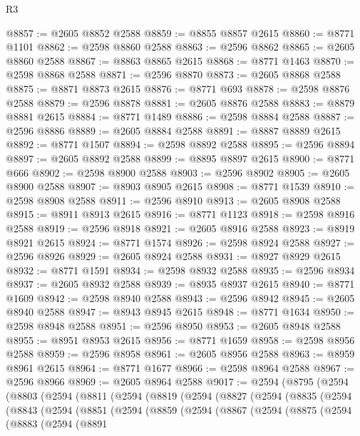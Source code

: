 \begin{lexlean}{R3}
\begin{coremodule}
@8857 := @2605 @8852 @2588
@8859 := @8855 @8857 @2615
@8860 := @8771 @1101
@8862 := @2598 @8860 @2588
@8863 := @2596 @8862
@8865 := @2605 @8860 @2588
@8867 := @8863 @8865 @2615
@8868 := @8771 @1463
@8870 := @2598 @8868 @2588
@8871 := @2596 @8870
@8873 := @2605 @8868 @2588
@8875 := @8871 @8873 @2615
@8876 := @8771 @693
@8878 := @2598 @8876 @2588
@8879 := @2596 @8878
@8881 := @2605 @8876 @2588
@8883 := @8879 @8881 @2615
@8884 := @8771 @1489
@8886 := @2598 @8884 @2588
@8887 := @2596 @8886
@8889 := @2605 @8884 @2588
@8891 := @8887 @8889 @2615
@8892 := @8771 @1507
@8894 := @2598 @8892 @2588
@8895 := @2596 @8894
@8897 := @2605 @8892 @2588
@8899 := @8895 @8897 @2615
@8900 := @8771 @666
@8902 := @2598 @8900 @2588
@8903 := @2596 @8902
@8905 := @2605 @8900 @2588
@8907 := @8903 @8905 @2615
@8908 := @8771 @1539
@8910 := @2598 @8908 @2588
@8911 := @2596 @8910
@8913 := @2605 @8908 @2588
@8915 := @8911 @8913 @2615
@8916 := @8771 @1123
@8918 := @2598 @8916 @2588
@8919 := @2596 @8918
@8921 := @2605 @8916 @2588
@8923 := @8919 @8921 @2615
@8924 := @8771 @1574
@8926 := @2598 @8924 @2588
@8927 := @2596 @8926
@8929 := @2605 @8924 @2588
@8931 := @8927 @8929 @2615
@8932 := @8771 @1591
@8934 := @2598 @8932 @2588
@8935 := @2596 @8934
@8937 := @2605 @8932 @2588
@8939 := @8935 @8937 @2615
@8940 := @8771 @1609
@8942 := @2598 @8940 @2588
@8943 := @2596 @8942
@8945 := @2605 @8940 @2588
@8947 := @8943 @8945 @2615
@8948 := @8771 @1634
@8950 := @2598 @8948 @2588
@8951 := @2596 @8950
@8953 := @2605 @8948 @2588
@8955 := @8951 @8953 @2615
@8956 := @8771 @1659
@8958 := @2598 @8956 @2588
@8959 := @2596 @8958
@8961 := @2605 @8956 @2588
@8963 := @8959 @8961 @2615
@8964 := @8771 @1677
@8966 := @2598 @8964 @2588
@8967 := @2596 @8966
@8969 := @2605 @8964 @2588
@9017 := @2594
    (@8795
      (@2594
        (@8803
          (@2594
            (@8811
              (@2594
                (@8819
                  (@2594
                    (@8827
                      (@2594
                        (@8835
                          (@2594
                            (@8843
                              (@2594
                                (@8851
                                  (@2594
                                    (@8859
                                      (@2594
                                        (@8867
                                          (@2594
                                            (@8875
                                              (@2594
                                                (@8883
                                                  (@2594
                                                    (@8891

\end{coremodule}
\end{lexlean}

